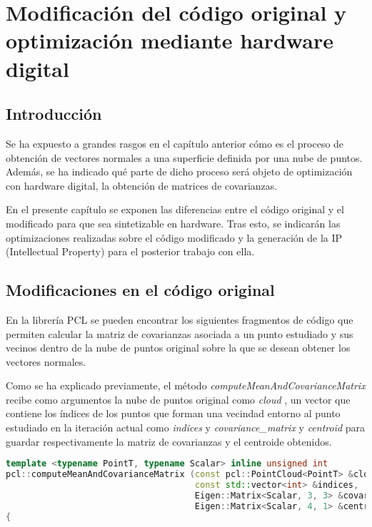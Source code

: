 \chapter{Modificación del código original y optimización mediante hardware digital}

\section{Introducción}
Se ha expuesto a grandes rasgos en el capítulo anterior cómo es el proceso de obtención de vectores normales a una superficie definida por una nube de puntos. Además, se ha indicado qué parte de dicho proceso será objeto de optimización con hardware digital, la obtención de matrices de covarianzas.

En el presente capítulo se exponen las diferencias entre el código original y el modificado para que sea sintetizable en hardware. Tras esto, se indicarán las optimizaciones realizadas sobre el código modificado y la generación de la IP (Intellectual Property) para el posterior trabajo con ella.


\section{Modificaciones en el código original}
En la librería PCL se pueden encontrar los siguientes fragmentos de código que permiten calcular la matriz de covarianzas asociada a un punto estudiado y sus vecinos dentro de la nube de puntos original sobre la que se desean obtener los vectores normales.

Como se ha explicado previamente, el método \textit{computeMeanAndCovarianceMatrix} recibe como argumentos la nube de puntos original como \textit{cloud} , un vector que contiene los índices de los puntos que forman una vecindad entorno al punto estudiado en la iteración actual como \textit{indices} y \textit{covariance\_matrix} y \textit{centroid} para guardar respectivamente la matriz de covarianzas y el centroide obtenidos.

\begin{lstlisting}[language=C++,breaklines]
  template <typename PointT, typename Scalar> inline unsigned int
pcl::computeMeanAndCovarianceMatrix (const pcl::PointCloud<PointT> &cloud,
                                     const std::vector<int> &indices,
                                     Eigen::Matrix<Scalar, 3, 3> &covariance_matrix,
                                     Eigen::Matrix<Scalar, 4, 1> &centroid)
{
\end{lstlisting}

